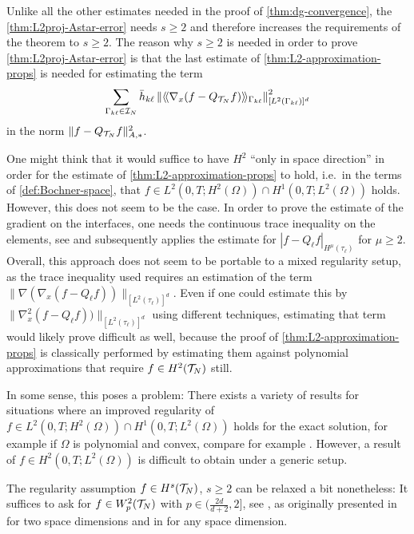 \documentclass[../thesis.tex]{subfiles}
\begin{document}
\begin{remark}
Unlike all the other estimates needed in the proof of \cref{thm:dg-convergence}, the \cref{thm:L2proj-Astar-error} needs $s \geq 2$ and therefore increases the requirements of the theorem to $s \geq 2$. The reason why $s \geq 2$ is needed in order to prove \cref{thm:L2proj-Astar-error} is that the last estimate of \cref{thm:L2-approximation-props} is needed for estimating the term
\[
	\sum_{\Gamma_{k \ell} \in \mathcal{I}_N} \bar{h}_{k \ell} \left\| \langle\!\langle \nabla_x (f - Q_{\mathcal{T}_N} f) \rangle\!\rangle_{\Gamma_{k \ell}} \right\|_{[L^2(\Gamma_{k \ell})]^d}^2
\]
in the norm $\| f - Q_{\mathcal{T}_N} f \|_{A,*}^2$.

One might think that it would suffice to have $H^2$ ``only in space direction'' in order for the estimate of \cref{thm:L2-approximation-props} to hold, i.e.\ in the terms of \cref{def:Bochner-space}, that $f \in L^2(0, T; H^2(\Omega)) \cap H^1(0, T; L^2(\Omega))$ holds.
However, this does not seem to be the case.
In order to prove the estimate of the gradient on the interfaces, one needs the continuous trace inequality on the elements, see \cite[Lemma 1.49]{DiPietroErn} and subsequently applies the estimate for $|f - Q_\ell f|_{H^\mu(\tau_\ell)}$ for $\mu \geq 2$.
Overall, this approach does not seem to be portable to a mixed regularity setup, as the trace inequality used requires an estimation of the term $\| \nabla ( \nabla_x (f - Q_\ell f) ) \|_{[L^2(\tau_\ell)]^d}$.
Even if one could estimate this by $\| \nabla_x^2 (f - Q_\ell f) ) \|_{[L^2(\tau_\ell)]^d}$ using different techniques, estimating that term would likely prove difficult as well, because the proof of \cref{thm:L2-approximation-props} is classically performed by estimating them against polynomial approximations that require $f \in H^2(\mathcal{T}_N)$ still.

In some sense, this poses a problem: There exists a variety of results for situations where an improved regularity of $f \in L^2(0, T; H^2(\Omega)) \cap H^1(0, T; L^2(\Omega))$ holds for the exact solution, for example if $\Omega$ is polynomial and convex, compare for example \cite[7.1.3 Regularity]{Evans}.
However, a result of $f \in H^2(0, T; L^2(\Omega))$ is difficult to obtain under a generic setup.

The regularity assumption $f \in H^s(\mathcal{T}_N)$, $s \geq 2$ can be relaxed a bit nonetheless: It suffices to ask for $f \in W_p^2(\mathcal{T}_N)$ with $p \in ( \frac{2d}{d+2}, 2 ]$, see \cite[4.2.5 Analysis for Low-Regularity Solutions]{DiPietroErn}, as originally presented in \cite{Wihler} for two space dimensions and in \cite{DiPietroErn-Low} for any space dimension.
\end{remark}
\end{document}
